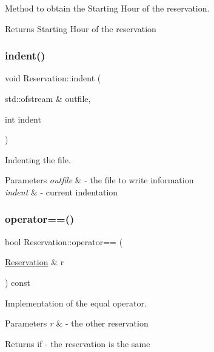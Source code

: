 Method to obtain the Starting Hour of the reservation. 

\begin{DoxyReturn}{Returns}
Starting Hour of the reservation 
\end{DoxyReturn}
\mbox{\label{class_reservation_a480981ed050bae19bc74bbb0bbb459f9}} 
\subsubsection{\texorpdfstring{indent()}{indent()}}
{\footnotesize\ttfamily void Reservation\+::indent (\begin{DoxyParamCaption}\item[{std\+::ofstream \&}]{outfile,  }\item[{int}]{indent }\end{DoxyParamCaption})}



Indenting the file. 


\begin{DoxyParams}{Parameters}
{\em outfile} & -\/ the file to write information \\
\hline
{\em indent} & -\/ current indentation \\
\hline
\end{DoxyParams}
\mbox{\label{class_reservation_ae033fc48c694b375e0cc68215f7dcfdb}} 
\subsubsection{\texorpdfstring{operator==()}{operator==()}\hspace{0.1cm}{\footnotesize\ttfamily [1/2]}}
{\footnotesize\ttfamily bool Reservation\+::operator== (\begin{DoxyParamCaption}\item[{\mbox{\hyperlink{class_reservation}{Reservation}} \&}]{r }\end{DoxyParamCaption}) const}



Implementation of the equal operator. 


\begin{DoxyParams}{Parameters}
{\em r} & -\/ the other reservation \\
\hline
\end{DoxyParams}
\begin{DoxyReturn}{Returns}
if -\/ the reservation is the same 
\end{DoxyReturn}
\mbox{\label{class_reservation_a228b1145e4b553c2f98d958a84de5ac1}} 
